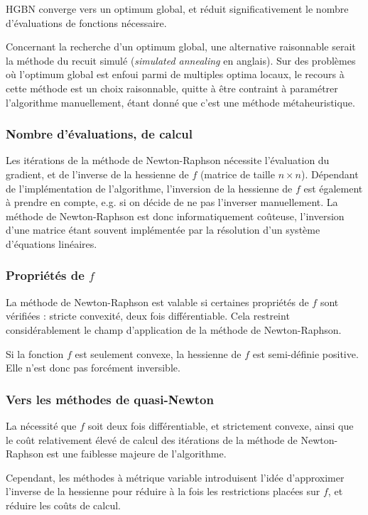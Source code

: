 \documentclass[3p, twocolumn]{elsarticle}
\begin{document}
HGBN converge vers un optimum global, et réduit significativement le nombre d'évaluations de fonctions nécessaire. 

\begin{rmk}
    Concernant la recherche d'un optimum global, une alternative raisonnable serait la méthode du recuit simulé (\textit{simulated annealing} en anglais). Sur des problèmes où l'optimum global est enfoui parmi de multiples optima locaux, le recours à cette méthode est un choix raisonnable, quitte à être contraint à paramétrer l'algorithme manuellement, étant donné que c'est une méthode métaheuristique.
\end{rmk}

\subsubsection{Nombre d'évaluations, de calcul}
Les itérations de la méthode de Newton-Raphson nécessite l'évaluation du gradient, et de l'inverse de la hessienne de $f$ (matrice de taille $n\times n$). Dépendant de l'implémentation de l'algorithme, l'inversion de la hessienne de $f$ est également à prendre en compte, e.g. si on décide de ne pas l'inverser manuellement. La méthode de Newton-Raphson est donc informatiquement coûteuse, l'inversion d'une matrice étant souvent implémentée par la résolution d'un système d'équations linéaires.

\subsubsection{Propriétés de $f$}
La méthode de Newton-Raphson est valable si certaines propriétés de $f$ sont vérifiées : stricte convexité, deux fois différentiable. Cela restreint considérablement le champ d'application de la méthode de Newton-Raphson.

Si la fonction $f$ est seulement convexe, la hessienne de $f$ est semi-définie positive. Elle n'est donc pas forcément inversible. 

\subsubsection{Vers les méthodes de quasi-Newton}
La nécessité que $f$ soit deux fois différentiable, et strictement convexe, ainsi que le coût relativement élevé de calcul des itérations de la méthode de Newton-Raphson est une faiblesse majeure de l'algorithme.

Cependant, les méthodes à métrique variable introduisent l'idée d'approximer l'inverse de la hessienne pour réduire à la fois les restrictions placées sur $f$, et réduire les coûts de calcul. 
\end{document}
